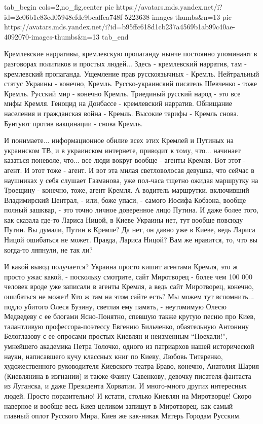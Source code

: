 \ifcmt
  tab_begin cols=2,no_fig,center
     pic https://avatars.mds.yandex.net/i?id=2e06b1c83ed05948efde9bcaffca748f-5223638-images-thumbs&n=13
		 pic https://avatars.mds.yandex.net/i?id=b95ffc618d1cb237a4569b1ab99c40ae-4092070-images-thumbs&n=13
  tab_end
\fi

Кремлевские нарративы, кремлевскую пропаганду нынче постоянно упоминают в разговорах политиков и
простых людей... Здесь - кремлевский нарратив, там - кремлевский пропаганда.
Ущемление прав русскоязычных - Кремль. Нейтральный статус Украины - конечно,
Кремль. Русско-украинский писатель Шевченко - тоже Кремль. Русский мир -
конечно Кремль. Триединый русский народ - это все мифы Кремля. Геноцид на
Донбассе - кремлевский нарратив. Обнищание населения и гражданская война -
Кремль. Высокие тарифы - Кремль снова. Бунтуют против вакцинации - снова
Кремль.

И понимаете... информационное обилие всех этих Кремлей и Путиных на украинском
ТВ, и в украинском интернете, приводит к тому, что... начинает казаться
поневоле, что... все люди вокруг вообще - агенты Кремля. Вот этот - агент. И
этот тоже - агент. И вот эта милая светловолосая девушка, что сейчас в
наушниках у себя слушает Газманова, уже пол-часа тщетно ожидая маршрутку на
Троещину - конечно, тоже, агент Кремля. А водитель маршрутки, включивший
Владимирский Централ, - или, боже упаси, - самого Иосифа Кобзона, вообще полный
зашквар, - это точно личное доверенное лицо Путина. И даже более того, как
сказала где-то Лариса Ницой, в Киеве Украины нет, тут вообще повсюду Путин. Вы
думали, Путин в Кремле? Да нет, он давно уже в Киеве, ведь Лариса Ницой
ошибаться не может. Правда, Лариса Ницой? Вам же нравится, то, что вы когда-то
ляпнули, не так ли?

И какой вывод получается? Украина просто кишит агентами Кремля, это ж просто
ужас какой, - поскольку смотрите, сайт Миротворец - более чем 100 000  человек
вроде уже записали в агенты Кремля, а ведь сайт Миротворец, конечно, ошибаться
не может!  Кто ж там на этом сайте есть? Мы можем тут вспомнить... подло
убитого Олеся Бузину, светлая ему память, - неутомимую Олесю Медведеву с ее
блогами Ясно-Понятно, спевшую также крутую песню про Киев, талантливую
профессора-поэтессу Евгению Бильченко, обаятельную Антонину Белоглазову с ее
опросами простых Киевлян и неизменным \enquote{Поехали!}, умнейшего академика
Петра Толочко, одного из патриархов нашей исторической науки, написавшего кучу
классных книг по Киеву, Любовь Титаренко, художественного руководителя
Киевского театра Браво, конечно, Анатолия Шария (Киевлянина в изгнании) и также
Фаину Савенкову, девочку писателя-фантаста из Луганска, и даже Президента
Хорватии. И много-много других интересных людей.  Просто поразительно!  И
кстати, столько Киевлян на Миротворце! Скоро наверное и вообще весь Киев
целиком запишут в Миротворец, как самый главный оплот Русского Мира, Киев же
как-никак Матерь Городам Русским.

